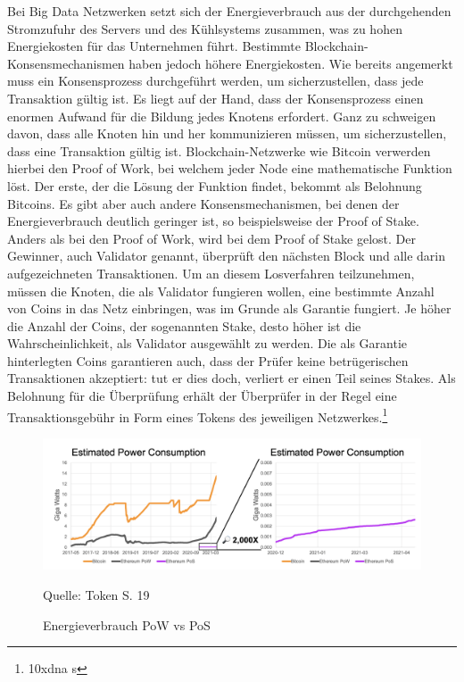 Bei Big Data Netzwerken setzt sich der Energieverbrauch aus der durchgehenden Stromzufuhr des Servers und des Kühlsystems zusammen, was zu hohen Energiekosten für das Unternehmen führt. 
Bestimmte Blockchain-Konsensmechanismen haben jedoch höhere Energiekosten.
Wie bereits angemerkt muss ein Konsensprozess durchgeführt werden, um sicherzustellen, dass jede Transaktion gültig ist. 
Es liegt auf der Hand, dass der Konsensprozess einen enormen Aufwand für die Bildung jedes Knotens erfordert. 
Ganz zu schweigen davon, dass alle Knoten hin und her kommunizieren müssen, um sicherzustellen, dass eine Transaktion gültig ist.
Blockchain-Netzwerke wie Bitcoin verwerden hierbei den Proof of Work, bei welchem jeder Node eine mathematische Funktion löst. 
Der erste, der die Lösung der Funktion findet, bekommt als Belohnung Bitcoins.
Es gibt aber auch andere Konsensmechanismen, bei denen der Energieverbrauch deutlich geringer ist, so beispielsweise der Proof of Stake.
Anders als bei den Proof of Work, wird bei dem Proof of Stake gelost. 
Der Gewinner, auch Validator genannt, überprüft den nächsten Block und alle darin aufgezeichneten Transaktionen. 
Um an diesem Losverfahren teilzunehmen, müssen die Knoten, die als Validator fungieren wollen, eine bestimmte Anzahl von Coins in das Netz einbringen, was im Grunde als Garantie fungiert. 
Je höher die Anzahl der Coins, der sogenannten Stake, desto höher ist die Wahrscheinlichkeit, als Validator ausgewählt zu werden. 
Die als Garantie hinterlegten Coins garantieren auch, dass der Prüfer keine betrügerischen Transaktionen akzeptiert: tut er dies doch, verliert er einen Teil seines Stakes. 
Als Belohnung für die Überprüfung erhält der Überprüfer in der Regel eine Transaktionsgebühr in Form eines Tokens des jeweiligen Netzwerkes.\footnote{10xdna s }

\begin{figure}[!ht]
    \caption{Energieverbrauch PoW vs PoS}
    \includegraphics[scale=0.6]{assets/figures/power_consumption.jpg}
    \begin{flushleft}
        Quelle: Token S. 19
    \end{flushleft}
    \label{fig:birds4}
\end{figure}

